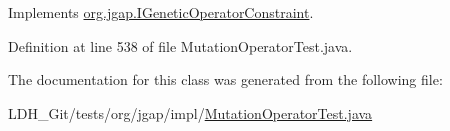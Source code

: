 Implements \hyperlink{interfaceorg_1_1jgap_1_1_i_genetic_operator_constraint_aad6e4b9c79f35e6e569e8d3c98876c50}{org.\-jgap.\-I\-Genetic\-Operator\-Constraint}.



Definition at line 538 of file Mutation\-Operator\-Test.\-java.



The documentation for this class was generated from the following file\-:\begin{DoxyCompactItemize}
\item 
L\-D\-H\-\_\-\-Git/tests/org/jgap/impl/\hyperlink{_mutation_operator_test_8java}{Mutation\-Operator\-Test.\-java}\end{DoxyCompactItemize}
